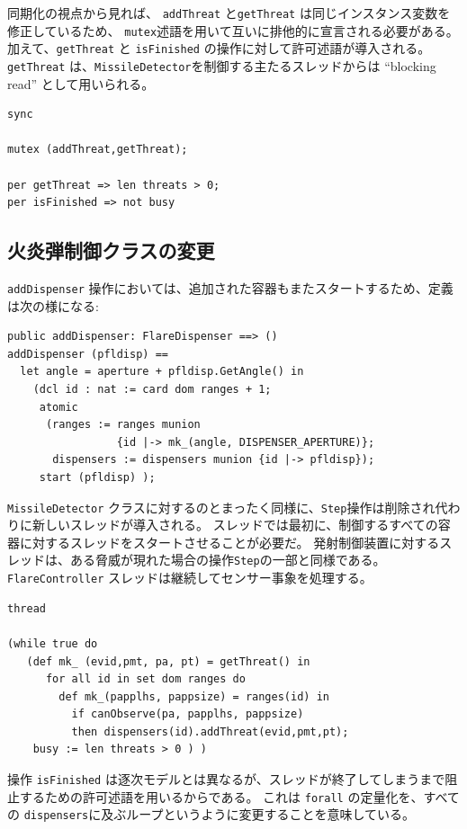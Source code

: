 \documentclass[\pformat,12pt]{jreport}
\begin{document}
同期化の視点から見れば、 \texttt{addThreat} と\texttt{getThreat} は同じインスタンス変数を修正しているため、 \texttt{mutex}述語を用いて互いに排他的に宣言される必要がある。
加えて、\texttt{getThreat} と \texttt{isFinished} の操作に対して許可述語が導入される。
\texttt{getThreat} は、\texttt{MissileDetector}を制御する主たるスレッドからは ``blocking read'' として用いられる。

\begin{lstlisting}
sync

mutex (addThreat,getThreat);

per getThreat => len threats > 0;
per isFinished => not busy
\end{lstlisting}

\subsection{火炎弾制御クラスの変更}

 \texttt{addDispenser} 操作においては、追加された容器もまたスタートするため、定義は次の様になる:

\begin{lstlisting}
public addDispenser: FlareDispenser ==> ()
addDispenser (pfldisp) ==
  let angle = aperture + pfldisp.GetAngle() in
    (dcl id : nat := card dom ranges + 1;
     atomic
      (ranges := ranges munion 
                 {id |-> mk_(angle, DISPENSER_APERTURE)};
       dispensers := dispensers munion {id |-> pfldisp});
     start (pfldisp) );
\end{lstlisting}

 \texttt{MissileDetector} クラスに対するのとまったく同様に、\texttt{Step}操作は削除され代わりに新しいスレッドが導入される。
スレッドでは最初に、制御するすべての容器に対するスレッドをスタートさせることが必要だ。
発射制御装置に対するスレッドは、ある脅威が現れた場合の操作\texttt{Step}の一部と同様である。
\texttt{FlareController} スレッドは継続してセンサー事象を処理する。

\begin{lstlisting}
thread

(while true do
   (def mk_ (evid,pmt, pa, pt) = getThreat() in
      for all id in set dom ranges do
        def mk_(papplhs, pappsize) = ranges(id) in
          if canObserve(pa, papplhs, pappsize)
          then dispensers(id).addThreat(evid,pmt,pt);
    busy := len threats > 0 ) )
\end{lstlisting}

操作 \texttt{isFinished} は逐次モデルとは異なるが、スレッドが終了してしまうまで阻止するための許可述語を用いるからである。
これは \texttt{forall} の定量化を、すべての  \texttt{dispensers}に及ぶループというように変更することを意味している。
\end{document}
